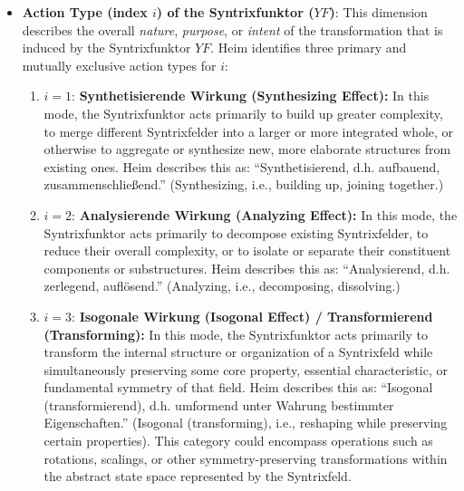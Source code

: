 \documentclass[12pt]{article}
\newcommand{\q}[1]{\enquote{#1}}
\newcommand{\syntrixfunktor}{YF}
\begin{document}
\begin{itemize}
    \item \textbf{Action Type (index \( i \)) of the Syntrixfunktor (\(\syntrixfunktor\))}: This dimension describes the overall \textit{nature}, \textit{purpose}, or \textit{intent} of the transformation that is induced by the Syntrixfunktor \( \syntrixfunktor \). Heim identifies three primary and mutually exclusive action types for \(i\):
    \begin{enumerate}
        \item \( i = 1 \): \textbf{Synthetisierende Wirkung (Synthesizing Effect):} In this mode, the Syntrixfunktor acts primarily to build up greater complexity, to merge different Syntrixfelder into a larger or more integrated whole, or otherwise to aggregate or synthesize new, more elaborate structures from existing ones. Heim describes this as: \q{Synthetisierend, d.h. aufbauend, zusammenschließend.} (Synthesizing, i.e., building up, joining together.)
        \item \( i = 2 \): \textbf{Analysierende Wirkung (Analyzing Effect):} In this mode, the Syntrixfunktor acts primarily to decompose existing Syntrixfelder, to reduce their overall complexity, or to isolate or separate their constituent components or substructures. Heim describes this as: \q{Analysierend, d.h. zerlegend, auflösend.} (Analyzing, i.e., decomposing, dissolving.)
        \item \( i = 3 \): \textbf{Isogonale Wirkung (Isogonal Effect) / Transformierend (Transforming):} In this mode, the Syntrixfunktor acts primarily to transform the internal structure or organization of a Syntrixfeld while simultaneously preserving some core property, essential characteristic, or fundamental symmetry of that field. Heim describes this as: \q{Isogonal (transformierend), d.h. umformend unter Wahrung bestimmter Eigenschaften.} (Isogonal (transforming), i.e., reshaping while preserving certain properties). This category could encompass operations such as rotations, scalings, or other symmetry-preserving transformations within the abstract state space represented by the Syntrixfeld.
    \end{enumerate}


\end{itemize}
\end{document}
